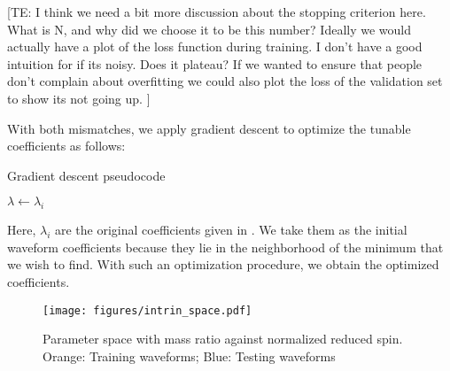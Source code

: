 \documentclass[twocolumn]{aastex631}
\newcommand{\te}[1]{{\color{rr}[TE: #1 ]}}
\begin{document}
\te{I think we need a bit more discussion about the stopping criterion here. What is N, and why did we choose it to be this number? Ideally we would actually have a plot of the loss function during training. I don't have a good intuition for if its noisy. Does it plateau? If we wanted to ensure that people don't complain about overfitting we could also plot the loss of the validation set to show its not going up.}

With both mismatches, we apply gradient descent to optimize the tunable coefficients as follows: 
\begin{algorithm}
	\caption{Gradient descent pseudocode}
	$\lambda\leftarrow\lambda_i$\\
	\Return{$\lambda$}
\end{algorithm}
Here, $\lambda_i$ are the original coefficients given in \citep{khan2016frequency}. We take them as the initial waveform coefficients because they lie in the neighborhood of the minimum that we wish to find. With such an optimization procedure, we obtain the optimized coefficients. 

\begin{figure}[t]
	\centering
	\texttt{[image: figures/intrin\_space.pdf]}
	\caption{Parameter space with mass ratio against normalized reduced spin. Orange: Training waveforms; Blue: Testing waveforms}
	\label{fig:intrin_space}
\end{figure}
\end{document}

